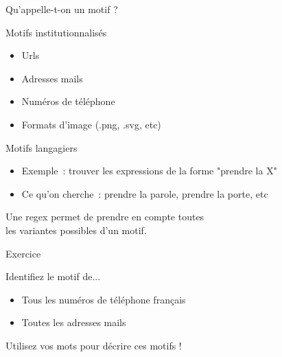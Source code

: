 \documentclass[serif, aspectratio=169]{beamer}
\begin{document}
\begin{frame}{Qu'appelle-t-on un motif ?}
    \begin{block}{Motifs institutionnalisés}
        \pause
        \begin{itemize}
            \item Urls
            \item Adresses mails
            \item Numéros de téléphone
            \item Formats d'image (.png, .svg, etc)
        \end{itemize}
    \end{block}
    \pause
    \begin{block}{Motifs langagiers}
        \begin{itemize}
            \item Exemple~: trouver les expressions de la forme "prendre la X"
            \item Ce qu'on cherche~: prendre la parole, prendre la porte, etc 
        \end{itemize}
    \end{block}
    \pause
    \begin{center}
        \Large
        Une regex permet de prendre en compte toutes \\ 
        les variantes possibles d'un motif.
    \end{center}
\end{frame}

\begin{exoframe}{Exercice}
    \begin{block}{Identifiez le motif de...}
        \begin{itemize} \color{white}
            \item Tous les numéros de téléphone français
            \item Toutes les adresses mails
        \end{itemize}
    \end{block}
    \vspace{15pt}
    \begin{center}
        \Large
        Utilisez vos mots pour décrire ces motifs !
    \end{center}
\end{exoframe}
\end{document}
